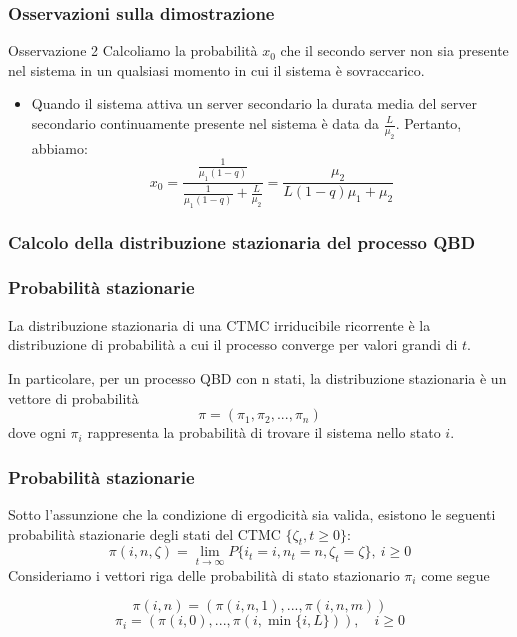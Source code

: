 \documentclass{beamer}
\begin{document}
\begin{frame}
    \frametitle{Osservazioni sulla dimostrazione}
    \begin{block}{Osservazione 2}
        Calcoliamo la probabilità $x_0$ che il secondo server non sia presente nel sistema in un qualsiasi momento in cui il sistema è sovraccarico.

        \begin{itemize}
            \item  Quando il sistema attiva un server secondario la durata media del server secondario continuamente presente nel sistema è data da $\frac{L}{\mu_2}$. Pertanto, abbiamo:
            \begin{equation*}
                x_0  = \frac{\frac{1}{\mu_1(1-q)}}{\frac{1}{\mu_1(1-q)} + \frac{L}{\mu_2}} = \frac{\mu_2}{L(1-q)\mu_1 + \mu_2}
            \end{equation*}
        \end{itemize}
    \end{block}
\end{frame}

\subsubsection{Calcolo della distribuzione stazionaria del processo QBD}

\begin{frame}
    \frametitle{Probabilità stazionarie}
    \begin{block}{}
         \begin{center}
            La distribuzione stazionaria di una CTMC irriducibile ricorrente è la distribuzione di probabilità a cui il processo converge per valori grandi di $t$.
         \end{center}
    \end{block}
    In particolare, per un processo QBD con n stati, la distribuzione stazionaria è un vettore di probabilità
    $$\pi = (\pi_1, \pi_2, ..., \pi_n)$$
    dove ogni $\pi_i$ rappresenta la probabilità di trovare il sistema nello stato $i$.
\end{frame}


\begin{frame}
    \frametitle{Probabilità stazionarie}
    Sotto l'assunzione che la condizione di ergodicità sia valida, esistono le seguenti probabilità stazionarie degli stati del CTMC $\{\zeta_t, t \geq 0\}$:
    $$\pi(i,n,\zeta) = \lim_{t \to \infty} P\{i_t = i, n_t = n, \zeta_t = \zeta\}, ~ i \geq 0$$
    Consideriamo i vettori riga delle probabilità di stato stazionario $\pi_i$ come segue
    \begin{block}{}
        $$\pi(i,n) = (\pi(i,n,1), ..., \pi(i,n,m))$$
        $$\pi_i = (\pi(i,0), ..., \pi(i, \min \{i,L\})), \quad i \geq 0$$
    \end{block}
\end{frame}
\end{document}
